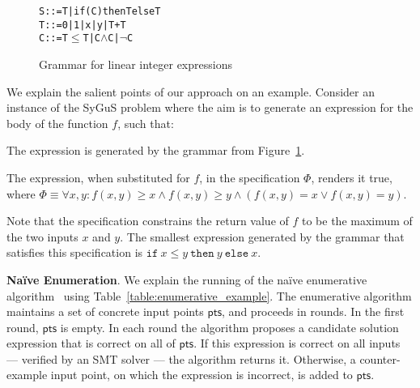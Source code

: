 \documentclass{llncs}
\newcommand\Points{\mathsf{pts}}
\newcommand\Spec{\Phi}
\newcommand\SynthFun{f}
\newcommand\ITE[3]{\mathtt{if}~#1~\mathtt{then}~#2~\mathtt{else}~#3}
\newcommand{\sygus}{{\sffamily\fontsize{8.5}{10}\selectfont
    SyGuS}\xspace}
\renewcommand{\paragraph}[1]{\par\noindent\textbf{#1}.}
\begin{document}
\begin{figure}[t]
  \vspace*{-1ex}
  \begin{alltt}
                      S ::= T | if (C) then T else T
                      T ::= 0 | 1 | x | y | T + T
                      C ::= T \(\leq\) T | C \(\wedge\) C | \(\neg\) C
  \end{alltt}
  \vspace*{-4ex}
  \caption{Grammar for linear integer expressions}
  \label{fig:lia_grammar}
\end{figure}
We explain the salient points of our approach on an example.
Consider an instance of the \sygus problem where the aim is to generate
an expression for the body of the function $f$, such that:
\begin{compactitem}
\item The expression is generated by the grammar from Figure~\ref{fig:lia_grammar}.
\item The expression, when substituted for $f$, in the specification
  $\Spec$, renders it true, where $\Spec \equiv \forall x, y :
  \SynthFun(x, y) \geq x \wedge \SynthFun(x, y) \geq y \wedge
  (\SynthFun(x,y) = x \vee \SynthFun(x,y) = y)$.
\end{compactitem}
Note that the specification constrains the return value of $\SynthFun$
to be the maximum of the two inputs $x$ and $y$.
The smallest expression generated by the grammar that satisfies this
specification is $\ITE{x \leq y}{y}{x}$.

\paragraph{Na\"ive Enumeration}
We explain the running of the na\"ive enumerative
algorithm~\cite{udupa-transit} using
Table~\ref{table:enumerative_example}.
The enumerative algorithm maintains a set of concrete input points
$\Points$, and proceeds in rounds.
In the first round, $\Points$ is empty.
In each round the algorithm proposes a candidate solution expression
that is correct on all of $\Points$.
If this expression is correct on all inputs --- verified by an SMT
solver --- the algorithm returns it.
Otherwise, a counter-example input point, on which the expression is
incorrect, is added to $\Points$.
\end{document}
